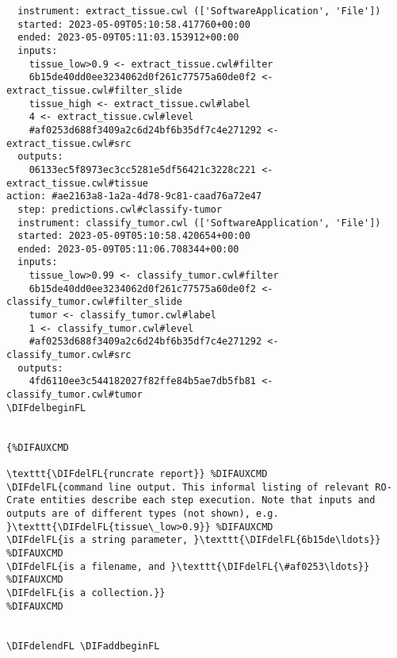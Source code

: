 \documentclass[10pt,letterpaper]{article}
\providecommand{\DIFdeltex}[1]{{\protect\color{red}\sout{#1}}}                      %
\providecommand{\DIFdelFL}[1]{\DIFdel{#1}} %
\providecommand{\DIFaddbeginFL}{} %
\providecommand{\DIFaddendFL}{} %
\providecommand{\DIFdelbeginFL}{} %
\providecommand{\DIFdelendFL}{} %
\providecommand{\DIFdel}[1]{\texorpdfstring{\DIFdeltex{#1}}{}} %
\newcommand{\DIFscaledelfig}{0.5}
\newlength{\DIFdelgraphicswidth} %
\newlength{\DIFdelgraphicsheight} %
\newcommand{\DIFaddincludegraphics}[2][]{{\color{blue}\fbox{\DIFOincludegraphics[#1]{#2}}}} %
\newcommand{\DIFdelincludegraphics}[2][]{%
\sbox{\DIFdelgraphicsbox}{\DIFOincludegraphics[#1]{#2}}%
\settoboxwidth{\DIFdelgraphicswidth}{\DIFdelgraphicsbox} %
\settoboxtotalheight{\DIFdelgraphicsheight}{\DIFdelgraphicsbox} %
\scalebox{\DIFscaledelfig}{%
\parbox[b]{\DIFdelgraphicswidth}{\usebox{\DIFdelgraphicsbox}\\[-\baselineskip] \rule{\DIFdelgraphicswidth}{0em}}\llap{\resizebox{\DIFdelgraphicswidth}{\DIFdelgraphicsheight}{%
\setlength{\unitlength}{\DIFdelgraphicswidth}%
\begin{picture}(1,1)%
\thicklines\linethickness{2pt} %
{\color[rgb]{1,0,0}\put(0,0){\framebox(1,1){}}}%
{\color[rgb]{1,0,0}\put(0,0){\line( 1,1){1}}}%
{\color[rgb]{1,0,0}\put(0,1){\line(1,-1){1}}}%
\end{picture}%
}\hspace*{3pt}}} %
} %
\DeclareRobustCommand{\DIFaddbeginFL}{\DIFOaddbeginFL \let\includegraphics\DIFaddincludegraphics} %
\DeclareRobustCommand{\DIFaddendFL}{\DIFOaddendFL \let\includegraphics\DIFOincludegraphics} %
\DeclareRobustCommand{\DIFdelbeginFL}{\DIFOdelbeginFL \let\includegraphics\DIFdelincludegraphics} %
\DeclareRobustCommand{\DIFdelendFL}{\DIFOaddendFL \let\includegraphics\DIFOincludegraphics} %
\begin{document}
\begin{lstlisting}
  instrument: extract_tissue.cwl (['SoftwareApplication', 'File'])
  started: 2023-05-09T05:10:58.417760+00:00
  ended: 2023-05-09T05:11:03.153912+00:00
  inputs:
    tissue_low>0.9 <- extract_tissue.cwl#filter
    6b15de40dd0ee3234062d0f261c77575a60de0f2 <- extract_tissue.cwl#filter_slide
    tissue_high <- extract_tissue.cwl#label
    4 <- extract_tissue.cwl#level
    #af0253d688f3409a2c6d24bf6b35df7c4e271292 <- extract_tissue.cwl#src
  outputs:
    06133ec5f8973ec3cc5281e5df56421c3228c221 <- extract_tissue.cwl#tissue
action: #ae2163a8-1a2a-4d78-9c81-caad76a72e47
  step: predictions.cwl#classify-tumor
  instrument: classify_tumor.cwl (['SoftwareApplication', 'File'])
  started: 2023-05-09T05:10:58.420654+00:00
  ended: 2023-05-09T05:11:06.708344+00:00
  inputs:
    tissue_low>0.99 <- classify_tumor.cwl#filter
    6b15de40dd0ee3234062d0f261c77575a60de0f2 <- classify_tumor.cwl#filter_slide
    tumor <- classify_tumor.cwl#label
    1 <- classify_tumor.cwl#level
    #af0253d688f3409a2c6d24bf6b35df7c4e271292 <- classify_tumor.cwl#src
  outputs:
    4fd6110ee3c544182027f82ffe84b5ae7db5fb81 <- classify_tumor.cwl#tumor
\DIFdelbeginFL 


{%DIFAUXCMD

\texttt{\DIFdelFL{runcrate report}} %DIFAUXCMD
\DIFdelFL{command line output. This informal listing of relevant RO-Crate entities describe each step execution. Note that inputs and outputs are of different types (not shown), e.g. }\texttt{\DIFdelFL{tissue\_low>0.9}} %DIFAUXCMD
\DIFdelFL{is a string parameter, }\texttt{\DIFdelFL{6b15de\ldots}} %DIFAUXCMD
\DIFdelFL{is a filename, and }\texttt{\DIFdelFL{\#af0253\ldots}} %DIFAUXCMD
\DIFdelFL{is a collection.}}
%DIFAUXCMD


\DIFdelendFL \DIFaddbeginFL \end{lstlisting}
\DIFaddendFL 


\DIFdelbeginFL %
\end{document}
